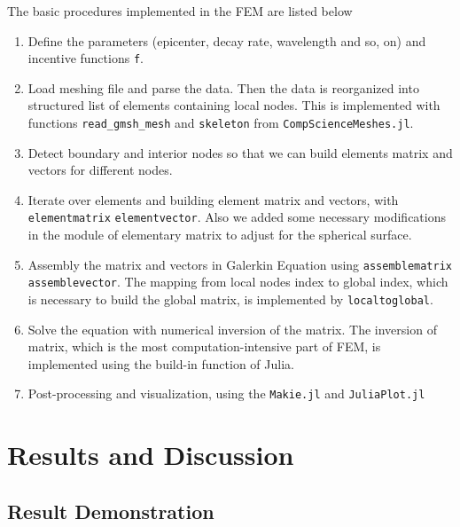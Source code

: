 \documentclass[a4paper]{article}
\begin{document}
The basic procedures implemented in the FEM are listed below
\begin{enumerate}
    \item Define the parameters (epicenter, decay rate, wavelength and so, on) and incentive functions \verb|f|. 
    \item Load meshing file and parse the data. Then the data is reorganized into structured list of elements containing local nodes. 
    This is implemented with functions \verb|read_gmsh_mesh| and \verb|skeleton| from \verb|CompScienceMeshes.jl|. 
    \item Detect boundary and interior nodes so that we can build elements matrix and vectors for different nodes.
    \item Iterate over elements and building element matrix and vectors, with \verb|elementmatrix| \verb|elementvector|.
    Also we added some necessary modifications in the module of elementary matrix to adjust for the spherical surface.
    \item Assembly the matrix and vectors in Galerkin Equation using \verb|assemblematrix| \verb|assemblevector|. The 
    mapping from local nodes index to global index, which is necessary to build the global matrix, is implemented by \verb|localtoglobal|.
    \item Solve the equation with numerical inversion of the matrix. The inversion of matrix, which is the most computation-intensive part of FEM, is implemented using 
    the build-in function of Julia. 
    \item Post-processing and visualization, using the \verb|Makie.jl| and \verb|JuliaPlot.jl|
\end{enumerate}

\section{Results and Discussion}
\subsection{Result Demonstration}
\end{document}
